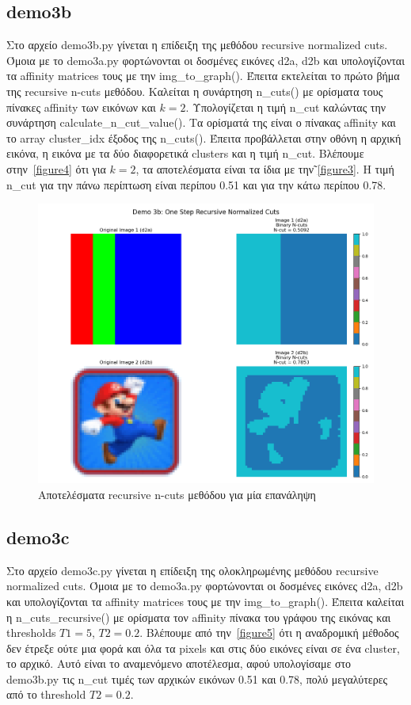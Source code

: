\documentclass{article}
\begin{document}
\subsection{demo3b}
Στο αρχείο demo3b.py γίνεται η επίδειξη της μεθόδου recursive normalized cuts. Όμοια
με το demo3a.py φορτώνονται οι δοσμένες εικόνες d2a, d2b και υπολογίζονται τα affinity 
matrices τους με την img\_to\_graph(). Έπειτα εκτελείται το πρώτο βήμα της recursive
n-cuts μεθόδου. Καλείται η συνάρτηση n\_cuts() με ορίσμα\-τα τους πίνακες affinity 
των εικόνων και $k=2$. Υπολογίζεται η τιμή n\_cut καλώντας την συνάρτηση 
calculate\_n\_cut\_value(). Τα ορίσμα\-τά της είναι ο πίνακας affinity και το
array cluster\_idx έξοδος της n\_cuts(). Έπειτα προβάλλεται στην οθόνη η 
αρχική εικόνα, η εικόνα με τα δύο διαφορετικά clusters και η τιμή n\_cut.
Βλέπουμε στην~\autoref{figure4} ότι για $k=2$, τα αποτελέσματα είναι τα 
ίδια με την῀\autoref{figure3}. Η τιμή n\_cut για την πάνω περίπτωση είναι περίπου 0.51 και για 
την κάτω περίπου 0.78. 

\begin{figure}
    \centering
    \includegraphics[width=\linewidth]{Figure_4.png}
    \caption{Αποτελέσματα recursive n-cuts μεθόδου για μία επανάληψη}\label{figure4}
\end{figure}

\subsection{demo3c}
Στο αρχείο demo3c.py γίνεται η επίδειξη της ολοκληρωμένης μεθόδου recursive 
normalized cuts. Όμοια με το demo3a.py φορτώνονται οι δοσμένες εικόνες d2a, d2b και υπολογίζονται τα affinity 
matrices τους με την img\_to\_graph(). Έπειτα καλείται η  n\_cuts\_recursive() 
με ορίσματα τον affinity πίνακα του γράφου της εικόνας και thresholds $T1=5$, $T2=0.2$. Βλέπουμε
από την~\autoref{figure5} ότι η αναδρομική μέθοδος δεν έτρεξε ούτε μια φορά και όλα τα pixels
και στις δύο εικόνες είναι σε ένα cluster, το αρχικό. Αυτό είναι το αναμενόμενο
αποτέλεσμα, αφού υπολογίσαμε στο demo3b.py τις n\_cut τιμές των αρχικών εικόνων 
0.51 και 0.78, πολύ μεγαλύτερες από το threshold $T2=0.2$.
\end{document}
